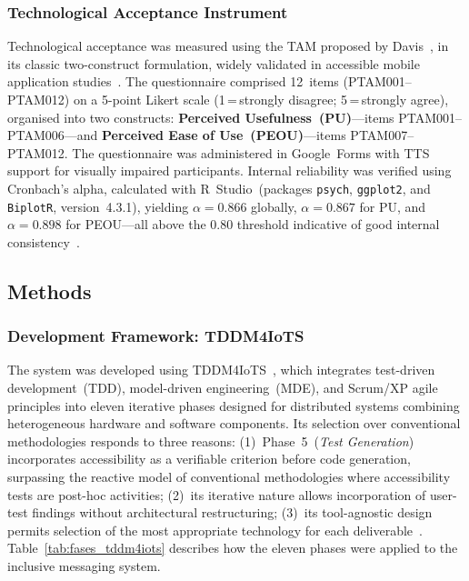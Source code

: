 \documentclass[journal]{IEEEtran}
\begin{document}
	\subsubsection{Technological Acceptance Instrument}
	Technological acceptance was measured using the TAM proposed by
	Davis~\cite{davis1989}, in its classic two-construct formulation,
	widely validated in accessible mobile application
	studies~\cite{julianto2023}.
	The questionnaire comprised 12~items (PTAM001--PTAM012) on a
	5-point Likert scale (1\,=\,strongly disagree;
	5\,=\,strongly agree), organised into two constructs:
	\textbf{Perceived Usefulness~(PU)}---items PTAM001--PTAM006---and
	\textbf{Perceived Ease of Use~(PEOU)}---items
	PTAM007--PTAM012.
	The questionnaire was administered in Google~Forms with TTS support
	for visually impaired participants.
	Internal reliability was verified using Cronbach's alpha,
	calculated with R~Studio~(packages \texttt{psych}, \texttt{ggplot2},
	and \texttt{BiplotR}, version~4.3.1), yielding
	$\alpha{=}0.866$ globally, $\alpha{=}0.867$ for PU, and
	$\alpha{=}0.898$ for PEOU---all above the 0.80 threshold
	indicative of good internal
	consistency~\cite{nunnally1978}.
	
	\subsection{Methods}
	
	\subsubsection{Development Framework: TDDM4IoTS}
	The system was developed using TDDM4IoTS~\cite{guerrero2020},
	which integrates test-driven development~(TDD), model-driven
	engineering~(MDE), and Scrum/XP agile principles into eleven
	iterative phases designed for distributed systems combining
	heterogeneous hardware and software components.
	Its selection over conventional methodologies responds to three
	reasons:
	(1)~Phase~5~(\textit{Test Generation}) incorporates accessibility
	as a verifiable criterion before code generation, surpassing the
	reactive model of conventional methodologies where accessibility
	tests are post-hoc activities;
	(2)~its iterative nature allows incorporation of user-test findings
	without architectural restructuring;
	(3)~its tool-agnostic design permits selection of the most
	appropriate technology for each deliverable~\cite{guerrero2020}.
	Table~\ref{tab:fases_tddm4iots} describes how the eleven phases
	were applied to the inclusive messaging system.
	
\end{document}
